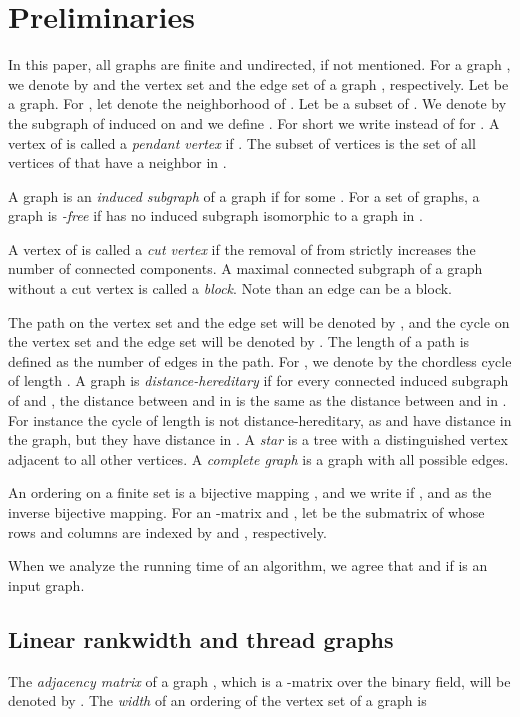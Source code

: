 \documentclass[11pt]{article}
\theoremstyle{remark}
\begin{document}
\section{Preliminaries}\label{sec:preliminaries}




In this paper, all graphs are finite and undirected, if not mentioned. 
For a graph , we denote by  and  the vertex set and the edge set of a graph , respectively.  
Let  be a graph.
For , let  denote the neighborhood of . 
Let  be a subset of . We denote by  the subgraph of  induced on  and we define .
For short we write  instead of  for .  A vertex  of  is called a \emph{pendant vertex} if
. 
The subset of vertices  is the set of all vertices of  that have a neighbor in . 


A graph  is an \emph{induced subgraph} of a graph  if  for some .
For a set  of graphs, a graph  is \emph{-free} if  has no induced subgraph isomorphic to a graph in . 

 A vertex  of  is called a {\em cut vertex} if the removal of  from  strictly increases the number of connected components. 
A maximal connected subgraph of a graph without a cut vertex is called a {\em block}.
 Note than an edge can be a block.

The path on the vertex set  and the edge set  will be denoted by , and 
the cycle on the vertex set  and the edge set  
will be denoted by .
The length of a path is defined as the number of edges in the path. For , we denote by  the chordless cycle of length . 
A graph  is \emph{distance-hereditary} if for every connected induced subgraph  of  and , 
the distance between  and  in  is the same as the distance between  and  in .
For instance the cycle  of length  is not distance-hereditary, as  and  have distance  in the graph, 
but they have distance  in .
A \emph{star}
is a tree with a distinguished vertex adjacent to all other vertices.  A \emph{complete graph} is a graph with all possible edges.



An ordering on a finite set  is a bijective mapping , and we write  if , and  as the inverse
bijective mapping. 
For an -matrix  and , let  be the submatrix of  whose rows and columns are indexed by  and , respectively.

When we analyze the running time of an algorithm, we agree that  and  if  is an input graph.


\subsection*{Linear rankwidth and thread graphs}
The \emph{adjacency matrix} of a graph , which is a -matrix over the binary field, will be denoted by .
The \emph{width} of an ordering  of the vertex set of a graph  is 
 
\end{document}
